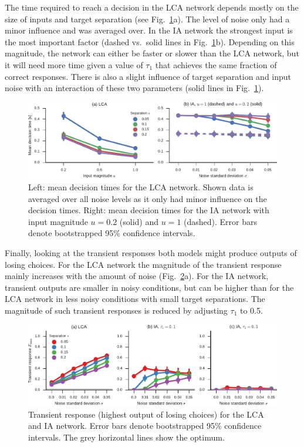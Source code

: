 \documentclass[10pt,letterpaper]{article}
\begin{document}
The time required to reach a decision in the LCA network depends mostly on the size of inputs and target separation (see Fig.~\ref{fig:time}a).
The level of noise only had a minor influence and was averaged over.
In the IA network the strongest input is the most important factor (dashed vs.\ solid lines in Fig.~\ref{fig:time}b).
Depending on this magnitude, the network can either be faster or slower than the LCA network, but it will need more time given a value of $\tau_1$ that achieves the same fraction of correct responses.
There is also a slight influence of target separation and input noise with an interaction of these two parameters (solid lines in Fig.~\ref{fig:time}).
\begin{figure}[t]
    \centering
    \includegraphics{figures/time}
    \caption{
        Left: mean decision times for the LCA network. Shown data is averaged over all noise levels as it only had minor influence on the decision times.
        Right: mean decision times for the IA network with input magnitude $u = 0.2$ (solid) and $u = 1$ (dashed).
        Error bars denote bootstrapped 95\% confidence intervals.
    }\label{fig:time}
\end{figure}


Finally, looking at the transient responses both models might produce outputs of losing choices.
For the LCA network the magnitude of the transient response mainly increases with the amount of noise (Fig.~\ref{fig:transient}a).
For the IA network, transient outputs are smaller in noisy conditions, but can be higher than for the LCA network in less noisy conditions with small target separations.
The magnitude of such transient responses is reduced by adjusting $\tau_1$ to 0.5.
\begin{figure}
    \centering
    \includegraphics{figures/transient}
    \caption{
        Transient response (highest output of losing choices) for the LCA and IA network.
        Error bars denote bootstrapped 95\% confidence intervals.
        The grey horizontal lines show the optimum.
    }\label{fig:transient}
\end{figure}
\end{document}
